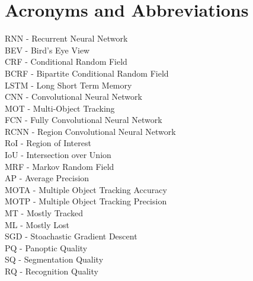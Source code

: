 \chapter*{Acronyms and Abbreviations}

\vspace{5mm}
RNN - Recurrent Neural Network \\
BEV - Bird's Eye View \\
CRF - Conditional Random Field \\
BCRF - Bipartite Conditional Random Field \\
LSTM - Long Short Term Memory \\
CNN - Convolutional Neural Network \\
MOT - Multi-Object Tracking \\
FCN - Fully Convolutional Neural Network \\
RCNN - Region Convolutional Neural Network \\
RoI - Region of Interest \\
IoU - Intersection over Union \\
MRF - Markov Random Field \\
AP - Average Precision \\
MOTA - Multiple Object Tracking Accuracy\\
MOTP - Multiple Object Tracking Precision \\
MT - Mostly Tracked \\
ML - Mostly Lost \\
SGD - Stoachastic Gradient Descent \\
PQ - Panoptic Quality \\
SQ - Segmentation Quality \\
RQ - Recognition Quality \\



